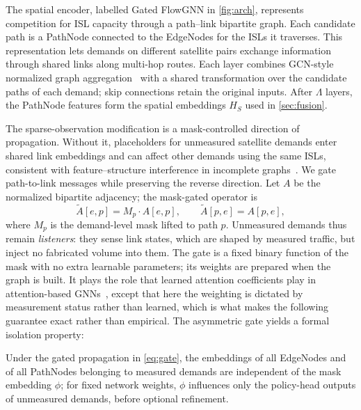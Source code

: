 The spatial encoder, labelled Gated FlowGNN in \cref{fig:arch}, represents
competition for ISL capacity through a path--link bipartite graph. Each
candidate path is a PathNode connected to the EdgeNodes for the ISLs it
traverses. This representation lets demands on different satellite pairs
exchange information through shared links along multi-hop routes.
Each layer combines GCN-style normalized graph aggregation~\cite{kipf2017}
with a shared transformation over the candidate paths of each demand; skip
connections retain the original inputs. After $\Lambda$ layers, the
PathNode features form the spatial embeddings $H_S$ used in
\cref{sec:fusion}.

The sparse-observation modification is a mask-controlled direction of
propagation. Without it, placeholders for unmeasured satellite demands enter
shared link embeddings and can affect other demands using the same ISLs,
consistent with feature--structure interference in incomplete graphs~\cite{t2gnn}.
We gate path-to-link messages while preserving the reverse direction.
Let $A$ be the normalized bipartite adjacency; the mask-gated operator is
\begin{equation}
    \tilde{A}[e, p] = M_p \cdot A[e, p], \qquad
    \tilde{A}[p, e] = A[p, e],
    \label{eq:gate}
\end{equation}
where $M_p$ is the demand-level mask lifted to path $p$. Unmeasured demands
thus remain \emph{listeners}: they sense link states, which are shaped by
measured traffic, but inject no fabricated volume into them. The gate is
a fixed binary function of the mask with no extra learnable parameters;
its weights are prepared when the graph is built. It plays the role that
learned attention coefficients play in attention-based GNNs~\cite{velickovic2018},
except that here the weighting is dictated by measurement status rather than
learned, which is what makes the following guarantee exact rather than
empirical. The asymmetric gate
yields a formal isolation property:

\begin{proposition}
\label{prop:isolation}
Under the gated propagation in \cref{eq:gate}, the embeddings of all
EdgeNodes and of all PathNodes belonging to measured demands are
independent of the mask embedding $\phi$; for fixed network weights,
$\phi$ influences only the policy-head outputs of unmeasured demands,
before optional refinement.
\end{proposition}


